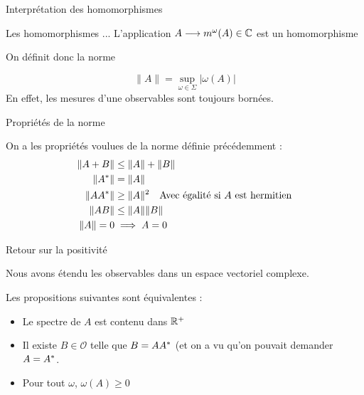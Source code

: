 \documentclass[11pt, xcolor=table]{beamer}
\begin{document}
\begin{frame}{Interprétation des homomorphismes}
    \begin{alertblock}{Les homomorphismes ...}
        L'application $ A \longrightarrow m^{\omega} (A) \in \mathbb{C}$ est un homomorphisme 
    \end{alertblock}
    On définit donc la norme 
    \begin{mydef}
        \[
            \| A \| = \sup_{\omega \in \Sigma} | \omega(A) | %
        \]
        En effet, les mesures d'une observables sont toujours bornées.
    \end{mydef}

\end{frame}

\begin{frame}{Propriétés de la norme}

    \begin{myth}
        On a les propriétés voulues de la norme définie précédemment :
        \begin{align*}
            \| A + B \| &\leq \| A \| + \| B \| \\
            \| A^\ast \| &= \| A \| \\
            \| A A^\ast \| &\geq \| A \|^2 \quad \text{Avec égalité si} \ A \ \text{est hermitien} \\
            \| AB \| &\leq \|A\| \| B \|\\
            \| A \| = 0 & \implies A = 0
        \end{align*}
    \end{myth}
\end{frame}

\begin{frame}{Retour sur la positivité}

    Nous avons étendu les observables dans un espace vectoriel complexe.
    \begin{myth}
       Les propositions suivantes sont équivalentes :
        \begin{itemize}
            \item Le spectre de $A$ est contenu dans $\mathbb{R}^+$
            \item Il existe $B \in \mathcal{O}$ telle que $B = A A^\ast $ (et on a vu qu'on pouvait demander $A = A^\ast$.
            \item Pour tout $\omega$, $\omega(A) \geq 0 $
        \end{itemize}

    \end{myth}
\end{frame}
\end{document}
